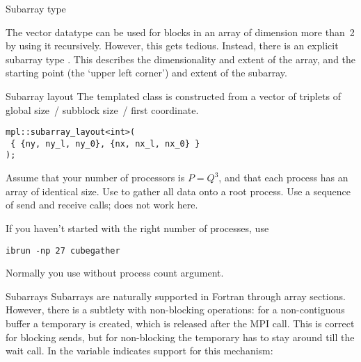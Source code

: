  {Subarray type}
\label{sec:type_subarray}

The vector datatype can be used for blocks in an array of dimension
more than~2 by using it recursively. However, this gets
tedious. Instead, there is an explicit subarray type
%
.
%
This describes the dimensionality and extent of the array, and
the starting point (the `upper left corner') and extent of the
subarray.

\begin{mplnote}{Subarray layout}
  The templated  class is constructed
  from a vector of triplets of global size~/ subblock size~/ first coordinate.
\begin{lstlisting}
mpl::subarray_layout<int>( 
 { {ny, ny_l, ny_0}, {nx, nx_l, nx_0} }
);  
\end{lstlisting}
\end{mplnote}

\begin{exercise}
  \label{ex:cubegather}
  Assume that your number of processors is $P=Q^3$, and that each
  process has an array of identical size. Use
   to gather all data onto a root process.
  Use a sequence of send and receive calls;
   does not work here.


\begin{tacc}
If you haven't started  with the right number of processes,
use
\begin{verbatim}
ibrun -np 27 cubegather
\end{verbatim}
Normally you use  without process count argument.
\end{tacc}

\end{exercise}

\begin{fortrannote}{Subarrays}
  Subarrays are naturally supported in Fortran through array sections.
  However, there is a subtlety with non-blocking operations:
  for a non-contiguous buffer a temporary is created, which is released
  after the MPI call. This is correct for blocking sends, but for non-blocking
  the temporary has to stay around till the wait call.
  In  the variable 
  indicates support for this mechanism:
\end{fortrannote}

